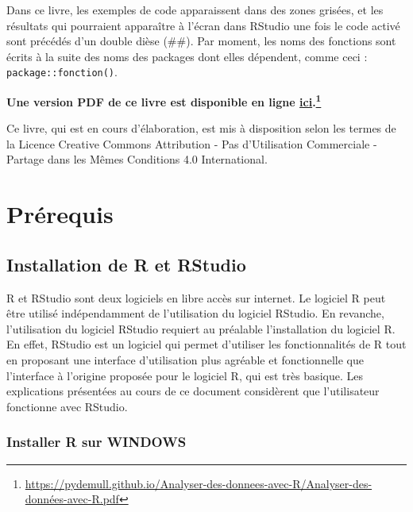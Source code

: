 \documentclass[
  french,
]{book}
\begin{document}
Dans ce livre, les exemples de code apparaissent dans des zones grisées, et les résultats qui pourraient apparaître à l'écran dans RStudio une fois le code activé sont précédés d'un double dièse (\#\#). Par moment, les noms des fonctions sont écrits à la suite des noms des packages dont elles dépendent, comme ceci : \texttt{package::fonction()}.

\textbf{Une version PDF de ce livre est disponible en ligne \href{https://pydemull.github.io/Analyser-des-donnees-avec-R/Analyser-des-données-avec-R.pdf}{ici}.\footnote{\url{https://pydemull.github.io/Analyser-des-donnees-avec-R/Analyser-des-données-avec-R.pdf}}}

Ce livre, qui est en cours d'élaboration, est mis à disposition selon les termes de la Licence Creative Commons Attribution - Pas d'Utilisation Commerciale - Partage dans les Mêmes Conditions 4.0 International.

\hypertarget{pruxe9requis}{%
\chapter{Prérequis}\label{pruxe9requis}}

\hypertarget{installation-de-r-et-rstudio}{%
\section{Installation de R et RStudio}\label{installation-de-r-et-rstudio}}

R et RStudio sont deux logiciels en libre accès sur internet. Le logiciel R peut être utilisé indépendamment de l'utilisation du logiciel RStudio. En revanche, l'utilisation du logiciel RStudio requiert au préalable l'installation du logiciel R. En effet, RStudio est un logiciel qui permet d'utiliser les fonctionnalités de R tout en proposant une interface d'utilisation plus agréable et fonctionnelle que l'interface à l'origine proposée pour le logiciel R, qui est très basique. Les explications présentées au cours de ce document considèrent que l'utilisateur fonctionne avec RStudio.

\hypertarget{installer-r-sur-windows}{%
\subsection{Installer R sur WINDOWS}\label{installer-r-sur-windows}}
\end{document}
